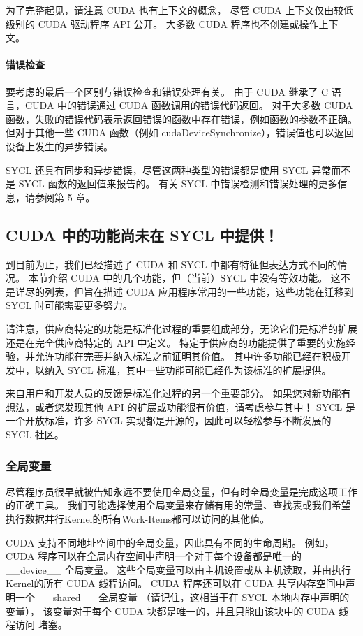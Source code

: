 为了完整起见，请注意 CUDA 也有上下文的概念，
尽管 CUDA 上下文仅由较低级别的 CUDA 驱动程序 API 公开。 大多数 CUDA 程序也不创建或操作上下文。

\paragraph{错误检查}

要考虑的最后一个区别与错误检查和错误处理有关。 
由于 CUDA 继承了 C 语言，CUDA 中的错误通过 CUDA 函数调用的错误代码返回。 
对于大多数 CUDA 函数，失败的错误代码表示返回错误的函数中存在错误，例如函数的参数不正确。 
但对于其他一些 CUDA 函数（例如 cudaDeviceSynchronize），错误值也可以返回设备上发生的异步错误。

SYCL 还具有同步和异步错误，尽管这两种类型的错误都是使用 SYCL 异常而不是 SYCL 函数的返回值来报告的。 
有关 SYCL 中错误检测和错误处理的更多信息，请参阅第 5 章。

\subsection{CUDA 中的功能尚未在 SYCL 中提供！}
到目前为止，我们已经描述了 CUDA 和 SYCL 中都有特征但表达方式不同的情况。 
本节介绍 CUDA 中的几个功能，但（当前）SYCL 中没有等效功能。 
这不是详尽的列表，但旨在描述 CUDA 应用程序常用的一些功能，这些功能在迁移到 SYCL 时可能需要更多努力。

请注意，供应商特定的功能是标准化过程的重要组成部分，无论它们是标准的扩展还是在完全供应商特定的 API 中定义。 
特定于供应商的功能提供了重要的实施经验，并允许功能在完善并纳入标准之前证明其价值。 
其中许多功能已经在积极开发中，以纳入 SYCL 标准，其中一些功能可能已经作为该标准的扩展提供。

\begin{remark}[参与进来！]
来自用户和开发人员的反馈是标准化过程的另一个重要部分。
如果您对新功能有想法，或者您发现其他 API 的扩展或功能很有价值，请考虑参与其中！
SYCL 是一个开放标准，许多 SYCL 实现都是开源的，因此可以轻松参与不断发展的 SYCL 社区。
\end{remark}

\subsubsection{全局变量}
尽管程序员很早就被告知永远不要使用全局变量，但有时全局变量是完成这项工作的正确工具。 
我们可能选择使用全局变量来存储有用的常量、查找表或我们希望执行数据并行Kernel的所有Work-Items都可以访问的其他值。

CUDA 支持不同地址空间中的全局变量，因此具有不同的生命周期。 
例如，CUDA 程序可以在全局内存空间中声明一个对于每个设备都是唯一的 \_\_device\_\_ 全局变量。 
这些全局变量可以由主机设置或从主机读取，并由执行Kernel的所有 CUDA 线程访问。 
CUDA 程序还可以在 CUDA 共享内存空间中声明一个 \_\_shared\_\_ 全局变量
（请记住，这相当于在 SYCL 本地内存中声明的变量），
该变量对于每个 CUDA 块都是唯一的，并且只能由该块中的 CUDA 线程访问 堵塞。

